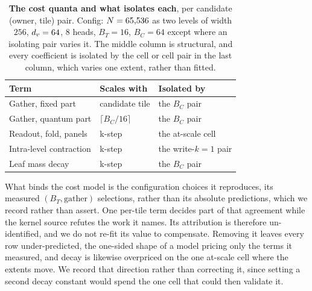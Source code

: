 \begin{table}[H]
\centering
\footnotesize
\caption{\textbf{The cost quanta and what isolates each}, per candidate (owner, tile) pair. Config: $N = 65{,}536$ as two levels of width $256$, $d_v = 64$, $8$ heads, $B_T = 16$, $B_C = 64$ except where an isolating pair varies it. The middle column is structural, and every coefficient is isolated by the cell or cell pair in the last column, which varies one extent, rather than fitted. }
\label{tab:quanta}
\begin{tabular}{@{}lll@{}}
\toprule
Term & Scales with & Isolated by \\
\midrule
Gather, fixed part      & candidate tile          & the $B_C$ pair \\
Gather, quantum part    & $\lceil B_C/16 \rceil$  & the $B_C$ pair \\
Readout, fold, panels   & k-step                  & the at-scale cell \\
Intra-level contraction & k-step                  & the write-$k{=}1$ pair \\
Leaf mass decay         & k-step                  & the $B_C$ pair \\
\bottomrule
\end{tabular}
\end{table}

What binds the cost model is the configuration choices it reproduces, its measured $(B_T, \text{gather})$ selections, rather than its absolute predictions, which we record rather than assert. One per-tile term decides part of that agreement while the kernel source refutes the work it names. Its attribution is therefore un-identified, and we do not re-fit its value to compensate. Removing it leaves every row under-predicted, the one-sided shape of a model pricing only the terms it measured, and decay is likewise overpriced on the one at-scale cell where the extents move. We record that direction rather than correcting it, since setting a second decay constant would spend the one cell that could then validate it. 

